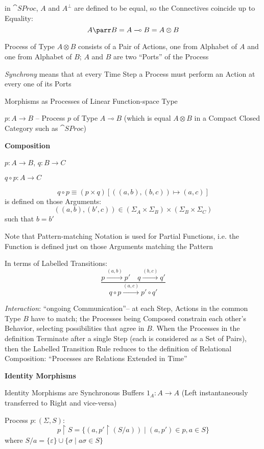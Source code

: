 in $\cat{SProc}$, $A$ and $A^\bot$ are defined to be equal, so the
Connectives coincide up to Equality:
\[
  A \parr B = A \multimap B = A \otimes B
\]

Process of Type $A \otimes B$ consists of a Pair of Actions, one from
Alphabet of $A$ and one from Alphabet of $B$; $A$ and $B$ are two
``Ports'' of the Process

\emph{Synchrony} means that at every Time Step a Process must perform
an Action at every one of its Ports

Morphisms as Processes of Linear Function-space Type

$p : A \rightarrow B$ -- Process $p$ of Type $A \multimap B$ (which is
equal $A \otimes B$ in a Compact Closed Category such as
$\cat{SProc}$)


\textbf{Composition}

$p : A \rightarrow B$, $q : B \rightarrow C$

$q \circ p : A \rightarrow C$

\[
  q \circ p \equiv (p \times q) [((a,b),(b,c)) \mapsto (a,c)]
\]
is defined on those Arguments:
\[
  ((a,b), (b',c))
    \in (\Sigma_A \times \Sigma_B) \times (\Sigma_B \times \Sigma_C)
\]
such that $b = b'$

\fist Note that Pattern-matching Notation is used for Partial
Functions, i.e. the Function is defined just on those Arguments
matching the Pattern

In terms of Labelled Transitions:
\[
  \frac{p \xrightarrow{(a,b)} p' \quad q \xrightarrow{(b,c)} q'}
  {q \circ p \xrightarrow{(a,c)} p' \circ q'}
\]

\emph{Interaction}: ``ongoing Communication''-- at each Step, Actions
in the common Type $B$ have to match; the Processes being Composed
constrain each other's Behavior, selecting possibilities that agree in
$B$. When the Processes in the definition Terminate after a single
Step (each is considered as a Set of Pairs), then the Labelled
Transition Rule reduces to the definition of Relational Composition:
``Processes are Relations Extended in Time''


\textbf{Identity Morphisms}

Identity Morphisms are Synchronous Buffers $1_A : A \rightarrow A$
(Left instantaneously transferred to Right and vice-versa)

Process $p : (\Sigma,S)$:
\[
  p \upharpoonright S = \{(a,p'\upharpoonright(S/a))
    \mid (a,p') \in p, a \in S\}
\]
where $S/a = \{\varepsilon\} \cup \{\sigma \mid a\sigma \in S\}$

